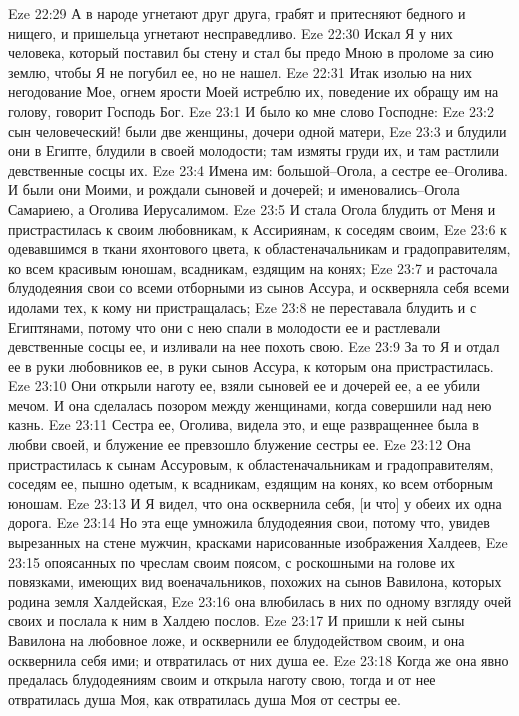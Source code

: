 Eze 22:29  А в народе угнетают друг друга, грабят и притесняют бедного и нищего, и пришельца угнетают несправедливо.
Eze 22:30  Искал Я у них человека, который поставил бы стену и стал бы предо Мною в проломе за сию землю, чтобы Я не погубил ее, но не нашел.
Eze 22:31  Итак изолью на них негодование Мое, огнем ярости Моей истреблю их, поведение их обращу им на голову, говорит Господь Бог.
Eze 23:1  И было ко мне слово Господне:
Eze 23:2  сын человеческий! были две женщины, дочери одной матери,
Eze 23:3  и блудили они в Египте, блудили в своей молодости; там измяты груди их, и там растлили девственные сосцы их.
Eze 23:4  Имена им: большой--Огола, а сестре ее--Оголива. И были они Моими, и рождали сыновей и дочерей; и именовались--Огола Самариею, а Оголива Иерусалимом.
Eze 23:5  И стала Огола блудить от Меня и пристрастилась к своим любовникам, к Ассириянам, к соседям своим,
Eze 23:6  к одевавшимся в ткани яхонтового цвета, к областеначальникам и градоправителям, ко всем красивым юношам, всадникам, ездящим на конях;
Eze 23:7  и расточала блудодеяния свои со всеми отборными из сынов Ассура, и оскверняла себя всеми идолами тех, к кому ни пристращалась;
Eze 23:8  не переставала блудить и с Египтянами, потому что они с нею спали в молодости ее и растлевали девственные сосцы ее, и изливали на нее похоть свою.
Eze 23:9  За то Я и отдал ее в руки любовников ее, в руки сынов Ассура, к которым она пристрастилась.
Eze 23:10  Они открыли наготу ее, взяли сыновей ее и дочерей ее, а ее убили мечом. И она сделалась позором между женщинами, когда совершили над нею казнь.
Eze 23:11  Сестра ее, Оголива, видела это, и еще развращеннее была в любви своей, и блужение ее превзошло блужение сестры ее.
Eze 23:12  Она пристрастилась к сынам Ассуровым, к областеначальникам и градоправителям, соседям ее, пышно одетым, к всадникам, ездящим на конях, ко всем отборным юношам.
Eze 23:13  И Я видел, что она осквернила себя, [и что] у обеих их одна дорога.
Eze 23:14  Но эта еще умножила блудодеяния свои, потому что, увидев вырезанных на стене мужчин, красками нарисованные изображения Халдеев,
Eze 23:15  опоясанных по чреслам своим поясом, с роскошными на голове их повязками, имеющих вид военачальников, похожих на сынов Вавилона, которых родина земля Халдейская,
Eze 23:16  она влюбилась в них по одному взгляду очей своих и послала к ним в Халдею послов.
Eze 23:17  И пришли к ней сыны Вавилона на любовное ложе, и осквернили ее блудодейством своим, и она осквернила себя ими; и отвратилась от них душа ее.
Eze 23:18  Когда же она явно предалась блудодеяниям своим и открыла наготу свою, тогда и от нее отвратилась душа Моя, как отвратилась душа Моя от сестры ее.
